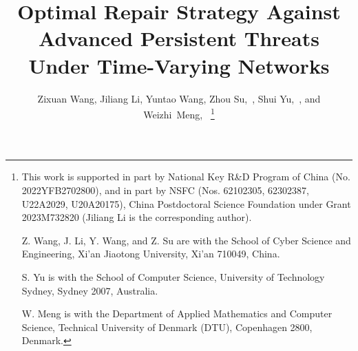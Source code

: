 \documentclass[lettersize,journal]{IEEEtran}
\begin{document}
\title{Optimal Repair Strategy Against Advanced Persistent Threats Under Time-Varying  Networks}

\author{Zixuan Wang, Jiliang Li, Yuntao Wang, Zhou Su,~, Shui Yu,~, and Weizhi~Meng,~
\thanks{This work is supported in part by National Key R\&D Program of China (No. 2022YFB2702800), and in part by NSFC (Nos. 62102305, 62302387, U22A2029, U20A20175), China Postdoctoral Science Foundation under Grant 2023M732820 (Jiliang Li is the corresponding author).\par
Z. Wang, J. Li, Y. Wang, and Z. Su are with the School of Cyber Science and Engineering, Xi'an Jiaotong University, Xi'an 710049, China. \par
  S. Yu is with the School of Computer Science, University of Technology Sydney, Sydney 2007, Australia. \par
  W. Meng is with the Department of Applied Mathematics and Computer Science, Technical University of Denmark (DTU), Copenhagen 2800, Denmark. }%
}


\maketitle
\end{document}
